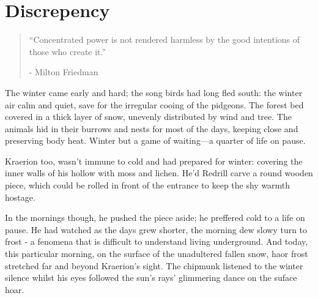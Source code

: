 \chapter{Discrepency}

\vspace{-1.3cm}
\begin{localsize}{10}
	\begin{quote}
	“Concentrated power is not rendered harmless by the good intentions of those who create it.” 
		\begin{flushright}- Milton Friedman \end{flushright}
	\end{quote} 
\end{localsize}
\vspace{1cm}





The winter came early and hard; the song birds had long fled south: the winter air calm and quiet, save for the irregular cooing of the pidgeons. The forest bed covered in a thick layer of snow, unevenly distributed by wind and tree. The animals hid in their burrows and nests for most of the days, keeping close and preserving body heat. Winter but a game of waiting—a quarter of life on pause.

Kraerion too, wasn't immune to cold and had prepared for winter: covering the inner walls of his hollow with moss and lichen. He'd Redrill carve a round wooden piece, which could be rolled in front of the entrance to keep the shy warmth hostage.

In the mornings though, he pushed the piece aside; he preffered cold to a life on pause. He had watched as the days grew shorter, the morning dew slowy turn to frost - a fenomena that is difficult to understand living underground. And today, this particular morning, on the surface of the unadultered fallen snow, haor frost stretched far and beyond Kraerion's sight. The chipmunk listened to the winter silence whilst his eyes followed the sun's rays' glimmering dance on the suface hoar.

